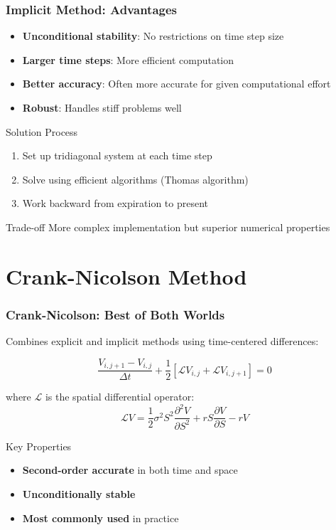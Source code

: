\documentclass{beamer}
\begin{document}
\begin{frame}
\frametitle{Implicit Method: Advantages}
\begin{itemize}
\item \textbf{Unconditional stability}: No restrictions on time step size
\item \textbf{Larger time steps}: More efficient computation
\item \textbf{Better accuracy}: Often more accurate for given computational effort
\item \textbf{Robust}: Handles stiff problems well
\end{itemize}

\begin{block}{Solution Process}
\begin{enumerate}
\item Set up tridiagonal system at each time step
\item Solve using efficient algorithms (Thomas algorithm)
\item Work backward from expiration to present
\end{enumerate}
\end{block}

\begin{block}{Trade-off}
More complex implementation but superior numerical properties
\end{block}
\end{frame}

\section{Crank-Nicolson Method}

\begin{frame}
\frametitle{Crank-Nicolson: Best of Both Worlds}
Combines explicit and implicit methods using time-centered differences:

\[\frac{V_{i,j+1} - V_{i,j}}{\Delta t} + \frac{1}{2}\left[ \mathcal{L}V_{i,j} + \mathcal{L}V_{i,j+1} \right] = 0\]

where \(\mathcal{L}\) is the spatial differential operator:
\[\mathcal{L}V = \frac{1}{2}\sigma^2 S^2 \frac{\partial^2 V}{\partial S^2} + rS \frac{\partial V}{\partial S} - rV\]

\begin{block}{Key Properties}
\begin{itemize}
\item \textbf{Second-order accurate} in both time and space
\item \textbf{Unconditionally stable}
\item \textbf{Most commonly used} in practice
\end{itemize}
\end{block}
\end{frame}
\end{document}
